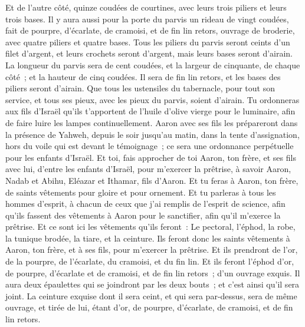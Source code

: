 \begin{multicols}{2}
Et de l'autre côté, quinze coudées de courtines, avec leurs trois piliers et leurs trois bases.
Il y aura aussi pour la porte du parvis un rideau de vingt coudées, fait de pourpre, d'écarlate, de cramoisi, et de fin lin retors, ouvrage de broderie, avec quatre piliers et quatre bases.
Tous les piliers du parvis seront ceints d'un filet d'argent, et leurs crochets seront d'argent, mais leurs bases seront d'airain.
La longueur du parvis sera de cent coudées, et la largeur de cinquante, de chaque côté~; et la hauteur de cinq coudées. Il sera de fin lin retors, et les bases des piliers seront d'airain.
Que tous les ustensiles du tabernacle, pour tout son service, et tous ses pieux, avec les pieux du parvis, soient d'airain.
Tu ordonneras aux fils d'Israël qu'ils t'apportent de l'huile d'olive vierge pour le luminaire, afin de faire luire les lampes continuellement.
Aaron avec ses fils les prépareront dans la présence de Yahweh, depuis le soir jusqu'au matin, dans la tente d'assignation, hors du voile qui est devant le témoignage~; ce sera une ordonnance perpétuelle pour les enfants d'Israël.
\VerseOne{}Et toi, fais approcher de toi Aaron, ton frère, et ses fils avec lui, d'entre les enfants d'Israël, pour m'exercer la prêtrise, à savoir Aaron, Nadab et Abihu, Eléazar et Ithamar, fils d'Aaron.
Et tu feras à Aaron, ton frère, de saints vêtements pour gloire et pour ornement.
Et tu parleras à tous les hommes d'esprit, à chacun de ceux que j'ai remplis de l'esprit de science, afin qu'ils fassent des vêtements à Aaron pour le sanctifier, afin qu'il m'exerce la prêtrise.
Et ce sont ici les vêtements qu'ils feront~: Le pectoral, l'éphod, la robe, la tunique brodée, la tiare, et la ceinture. Ils feront donc les saints vêtements à Aaron, ton frère, et à ses fils, pour m'exercer la prêtrise.
Et ils prendront de l'or, de la pourpre, de l'écarlate, du cramoisi, et du fin lin.
Et ils feront l'éphod d'or, de pourpre, d'écarlate et de cramoisi, et de fin lin retors~; d'un ouvrage exquis.
Il aura deux épaulettes qui se joindront par les deux bouts~; et c'est ainsi qu'il sera joint.
La ceinture exquise dont il sera ceint, et qui sera par-dessus, sera de même ouvrage, et tirée de lui, étant d'or, de pourpre, d'écarlate, de cramoisi, et de fin lin retors.

\end{multicols}

